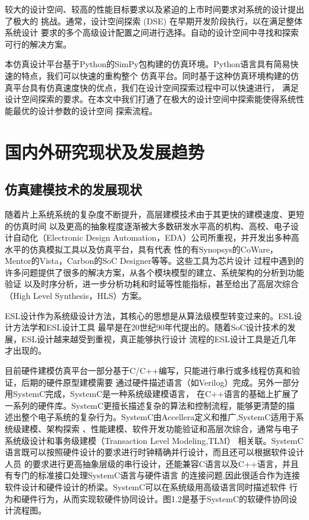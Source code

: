 较大的设计空间、较高的性能目标要求以及紧迫的上市时间要求对系统的设计提出了极大的
挑战。通常，设计空间探索 (DSE)\cite{5} 在早期开发阶段执行，以在满足整体系统设计
要求的多个高级设计配置之间进行选择。自动的设计空间中寻找和探索可行的解决方案。

本仿真设计平台基于Python的SimPy\cite{6}包构建的仿真环境。Python语言具有简易快速的特点，我们可以快速的重构整个
仿真平台。同时基于这种仿真环境构建的仿真平台具有仿真速度快的优点，我们在设计空间探索过程中可以快速进行，
满足设计空间探索的要求。在本文中我们打通了在极大的设计空间中探索能使得系统性能最优的设计参数的设计空间
探索流程。

\section{国内外研究现状及发展趋势}

\subsection{仿真建模技术的发展现状}
随着片上系统系统的复杂度不断提升，高层建模技术由于其更快的建模速度、更短的仿真时间
以及更高的抽象程度逐渐被大多数研发水平高的机构、高校、电子设计自动化（Electronic Design 
Automation，EDA）公司所重视，并开发出多种高水平的仿真模拟工具以及仿真平台，具有代表
性的有Synopsys的CoWare，Mentor的Vista，Carbon的SoC Designer等等。这些工具为芯片设计
过程中遇到的许多问题提供了很多的解决方案，从各个模块模型的建立、系统架构的分析到功能验证
以及时序分析，进一步分析功耗和时延等性能指标\cite{38}，甚至给出了高层次综合（High Level Synthesis，HLS）方案。

ESL设计作为系统级设计方法，其核心的思想是从算法级模型转变过来的。ESL设计方法学和ESL设计工具
最早是在20世纪90年代提出的。随着SoC设计技术的发展，ESL设计越来越受到重视，真正能够执行设计
流程的ESL设计工具是近几年才出现的。

目前硬件建模仿真平台一部分基于C/C++编写，只能进行串行或多线程仿真和验证，后期的硬件原型建模需要
通过硬件描述语言（如Verilog）完成。另外一部分用SystemC完成，SystemC\cite{7}是一种系统级建模语言，
在C++语言的基础上扩展了一系列的硬件库。SystemC更擅长描述复杂的算法和控制流程，能够更清楚的描
述出整个电子系统的复杂行为。SystemC由Accellera定义和推广,SystemC适用于系统级建模、架构探索
、性能建模、软件开发功能验证和高层次综合，通常与电子系统级设计和事务级建模（Transaction Level Modeling,TLM）
相关联。SystemC语言既可以按照硬件设计的要求进行时钟精确并行设计，而且还可以根据软件设计人员
的要求进行更高抽象层级的串行设计，还能兼容C语言以及C++语言，并且有专门的标准接口处理SystemC语言与硬件语言
的连接问题,因此很适合作为连接软件设计和硬件设计的桥梁\cite{37}。SystemC可以在系统级用高级语言同时描述软件
行为和硬件行为，从而实现软硬件协同设计\cite{40}。图1.2是基于SystemC的软硬件协同设计流程图。

